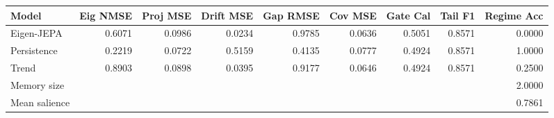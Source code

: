 \begin{tabular}{lrrrrrrrr}
\toprule
Model & Eig NMSE & Proj MSE & Drift MSE & Gap RMSE & Cov MSE & Gate Cal & Tail F1 & Regime Acc \\
\midrule
Eigen-JEPA & 0.6071 & 0.0986 & 0.0234 & 0.9785 & 0.0636 & 0.5051 & 0.8571 & 0.0000 \\
Persistence & 0.2219 & 0.0722 & 0.5159 & 0.4135 & 0.0777 & 0.4924 & 0.8571 & 1.0000 \\
Trend & 0.8903 & 0.0898 & 0.0395 & 0.9177 & 0.0646 & 0.4924 & 0.8571 & 0.2500 \\
\midrule
Memory size & \multicolumn{8}{r}{2.0000} \\
Mean salience & \multicolumn{8}{r}{0.7861} \\
\bottomrule
\end{tabular}